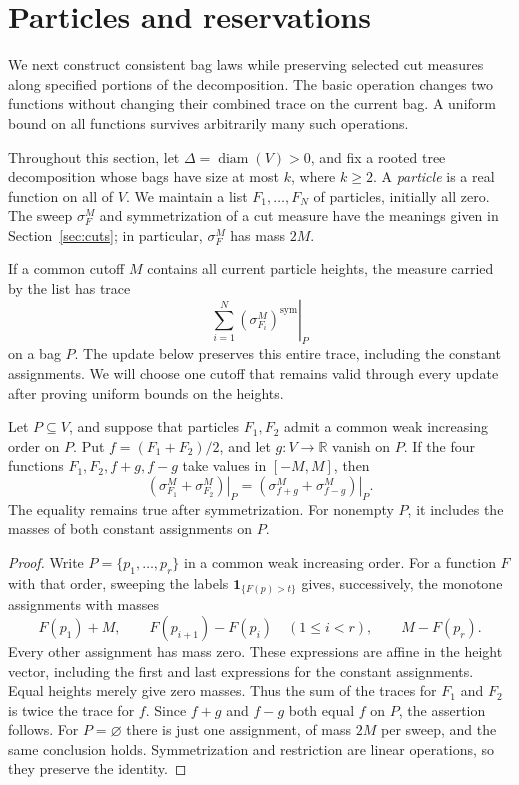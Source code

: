 \section{Particles and reservations}
\label{sec:particles}

We next construct consistent bag laws while preserving selected cut measures
along specified portions of the decomposition.  The basic operation changes
two functions without changing their combined trace on the current bag.  A
uniform bound on all functions survives arbitrarily many such operations.

Throughout this section, let $\Delta=\operatorname{diam}(V)>0$, and fix a
rooted tree decomposition whose bags have size at most $k$, where $k\ge2$.
A \emph{particle} is a real function on all of $V$.  We maintain a list
$F_1,\ldots,F_N$ of particles, initially all zero.  The sweep
$\sigma_F^M$ and symmetrization of a cut measure have the meanings given in
Section~\ref{sec:cuts}; in particular, $\sigma_F^M$ has mass $2M$.

If a common cutoff $M$ contains all current particle heights, the
measure carried by the list has trace
\[
 \left.\sum_{i=1}^N(\sigma_{F_i}^M)^{\mathrm{sym}}\right|_P
\]
on a bag $P$. The update below preserves this entire trace, including
the constant assignments. We will choose one cutoff that remains valid
through every update after proving uniform bounds on the heights.

\begin{lemma}
\label{lem:trace-update}
Let $P\subseteq V$, and suppose that particles $F_1,F_2$ admit a common
weak increasing order on $P$.  Put $f=(F_1+F_2)/2$, and let $g:V\to\mathbb R$
vanish on $P$.  If the four functions $F_1,F_2,f+g,f-g$ take values in
$[-M,M]$, then
\[
 \left.(\sigma_{F_1}^M+\sigma_{F_2}^M)\right|_P
 =\left.(\sigma_{f+g}^M+\sigma_{f-g}^M)\right|_P.
\]
The equality remains true after symmetrization.  For nonempty $P$, it
includes the masses of both constant assignments on $P$.
\end{lemma}

\begin{proof}
Write $P=\{p_1,\ldots,p_r\}$ in a common weak increasing order.  For a
function $F$ with that order, sweeping the labels
$\mathbf 1_{\{F(p)>t\}}$ gives, successively, the monotone assignments with
masses
\[
 F(p_1)+M,\qquad
 F(p_{i+1})-F(p_i)\quad(1\le i<r),\qquad
 M-F(p_r).
\]
Every other assignment has mass zero.  These expressions are affine in the
height vector, including the first and last expressions for the constant
assignments.  Equal heights merely give zero masses.  Thus the sum of the
traces for $F_1$ and $F_2$ is twice the trace for $f$.  Since $f+g$ and
$f-g$ both equal $f$ on $P$, the assertion follows.  For $P=\varnothing$
there is just one assignment, of mass $2M$ per sweep, and the same
conclusion holds.  Symmetrization and restriction are linear operations,
so they preserve the identity.
\end{proof}

